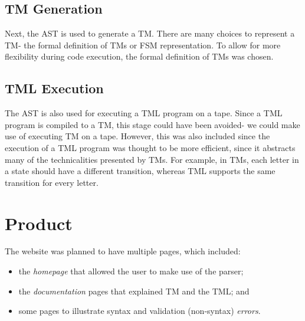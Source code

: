 

\subsection{TM Generation}
Next, the AST is used to generate a TM. There are many choices to represent a TM- the formal definition of TMs or FSM representation. To allow for more flexibility during code execution, the formal definition of TMs was chosen. 


\subsection{TML Execution}

The AST is also used for executing a TML program on a tape. Since a TML program is compiled to a TM, this stage could have been avoided- we could make use of executing TM on a tape. However, this was also included since the execution of a TML program was thought to be more efficient, since it abstracts many of the technicalities presented by TMs. For example, in TMs, each letter in a state should have a different transition, whereas TML supports the same transition for every letter.


\section{Product}

The website was planned to have multiple pages, which included:
\begin{itemize}
    \item the \emph{homepage} that allowed the user to make use of the parser;
    \item the \emph{documentation} pages that explained TM and the TML; and
    \item some pages to illustrate syntax and validation (non-syntax) \emph{errors}.
\end{itemize}


